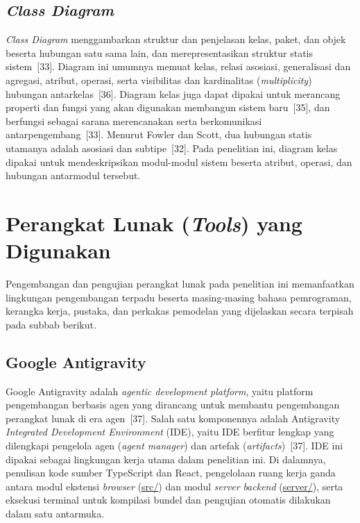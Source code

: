 \documentclass[12pt,a4paper,twoside]{report}
\begin{document}
\subsection{\textit{Class Diagram}}

\textit{Class Diagram} menggambarkan struktur dan penjelasan kelas, paket, dan objek beserta hubungan satu sama lain, dan merepresentasikan struktur statis sistem~[33]. Diagram ini umumnya memuat kelas, relasi asosiasi, generalisasi dan agregasi, atribut, operasi, serta visibilitas dan kardinalitas (\textit{multiplicity}) hubungan antarkelas~[36]. Diagram kelas juga dapat dipakai untuk merancang properti dan fungsi yang akan digunakan membangun sistem baru~[35], dan berfungsi sebagai sarana merencanakan serta berkomunikasi antarpengembang~[33]. Menurut Fowler dan Scott, dua hubungan statis utamanya adalah asosiasi dan subtipe~[32]. Pada penelitian ini, diagram kelas dipakai untuk mendeskripsikan modul-modul sistem beserta atribut, operasi, dan hubungan antarmodul tersebut.

\section{Perangkat Lunak (\textit{Tools}) yang Digunakan}

Pengembangan dan pengujian perangkat lunak pada penelitian ini memanfaatkan lingkungan pengembangan terpadu beserta masing-masing bahasa pemrograman, kerangka kerja, pustaka, dan perkakas pemodelan yang dijelaskan secara terpisah pada subbab berikut.

\subsection{Google Antigravity}

Google Antigravity adalah \textit{agentic development platform}, yaitu platform pengembangan berbasis agen yang dirancang untuk membantu pengembangan perangkat lunak di era agen~[37]. Salah satu komponennya adalah Antigravity \textit{Integrated Development Environment} (IDE), yaitu IDE berfitur lengkap yang dilengkapi pengelola agen (\textit{agent manager}) dan artefak (\textit{artifacts})~[37]. IDE ini dipakai sebagai lingkungan kerja utama dalam penelitian ini. Di dalamnya, penulisan kode sumber TypeScript dan React, pengelolaan ruang kerja ganda antara modul ekstensi \textit{browser} (\url{src/}) dan modul \textit{server} \textit{backend} (\url{server/}), serta eksekusi terminal untuk kompilasi bundel dan pengujian otomatis dilakukan dalam satu antarmuka.
\end{document}
